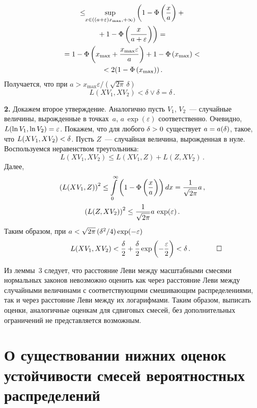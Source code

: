 \begin{multicols}{2}
\noindent
\begin{multline*}
{}\le
      \!\!\sup\limits_{x \in ((a+\varepsilon)x_{\max},+\infty)}
      \left( 1 - \Phi\left(\displaystyle\frac{\displaystyle x\mathstrut}{\displaystyle a\mathstrut}\right)   +{}\right.\\
\left.      {}+
      1 - \Phi\left(\displaystyle\frac{\displaystyle x \mathstrut}{\displaystyle a+\varepsilon\mathstrut} \right)
      \right)=      {}\\
      {}      =   1 - \Phi\left(x_{\max} + \displaystyle\frac{\displaystyle  x_{\max} \varepsilon  \mathstrut}{\displaystyle    a  \mathstrut}\right)   +
      1 - \Phi\left(  x_{\max}  \right)<{}\\
      {}<
      2( 1 - \Phi\left( x_{\max}   \right) )\,.
\end{multline*}
      Получается, что при
      $
      a >  x_{\max}\varepsilon/(\sqrt{2\pi}\,\delta)  $
      $$
       L(X V_1, X V_2) <   \delta   \vee \delta = \delta\,.
            $$

\noindent
\textbf{2.} Докажем второе утверждение. Аналогично пусть  
    $V_1$, $V_2$~--- случайные величины, вырожденные в точках~$a$,
      $a\,\exp(\varepsilon)$ соответственно.
      Очевидно, $L( \ln V_1, \ln V_2) \hm= \varepsilon$. 
      Покажем, что для любого $\delta\hm>0$ существует $a \hm= a(\delta)$, такое, что
      $L(X V_1, X V_2)\hm <\delta$. Пусть $Z$~--- 
      случайная величина, вырожденная в нуле. Воспользуемся неравенством треугольника:
      $$
      L(X V_1, X V_2)\le L(X V_1,Z) +  L(Z, X V_2)\,.
      $$
      Далее,
      \begin{gather*}
      \left(L(X V_1,Z)\right)^2\le
      \int\limits_0^{\infty}
      \left(1 - \Phi\left(\displaystyle\frac{\displaystyle x\mathstrut}{\displaystyle a\mathstrut}
      \right)\right)dx  = \displaystyle\frac{\displaystyle 1\mathstrut}{\displaystyle \sqrt{2\pi } \mathstrut}a\,, \\
      \left( L(Z, X V_2)\right)^2\le
       \displaystyle\frac{\displaystyle 1\mathstrut}{\displaystyle \sqrt{2\pi } \mathstrut}a\,\exp(\varepsilon)\,.
      \end{gather*}
      Таким образом, при $ a \hm<\sqrt{2\pi }\, (\delta^2/4) \exp(-\varepsilon)$
      $$
       ~~~~~~~~~~~~L(X V_1, X V_2) <  \displaystyle\frac{\displaystyle \delta\mathstrut}{\displaystyle 2\mathstrut} +
       \displaystyle\frac{\displaystyle  \delta\mathstrut}{\displaystyle 2\mathstrut}\exp\left(-\displaystyle\frac{\displaystyle \varepsilon\mathstrut}{\displaystyle 2\mathstrut}\right)
       < \delta\,.~~~~~~~~~~~\square
       $$



Из леммы~3 следует, что расстояние Леви между масштабными смесями
нормальных законов невозможно оценить как через расстояние Леви
между случайными величинами с соответствующими смешивающим
распределениями, так и через расстояние Леви между их логарифмами.
Таким образом, выписать оценки, аналогичные оценкам для сдвиговых
смесей, без дополнительных ограничений не представляется возможным.

\section{О существовании нижних оценок устойчивости
смесей вероятностных распределений}


\end{multicols}
